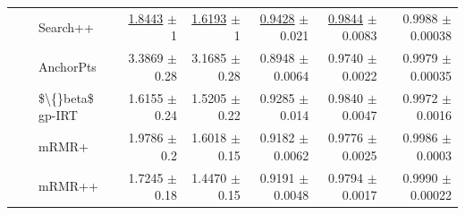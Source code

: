 \begin{longtable}{llp{}rrrrr}
 &  & Search++ & \underline{1.8443} {\scriptsize $\pm$ 1} & \underline{1.6193} {\scriptsize $\pm$ 1} & \underline{0.9428} {\scriptsize $\pm$ 0.021} & \underline{0.9844} {\scriptsize $\pm$ 0.0083} & 0.9988 {\scriptsize $\pm$ 0.00038} \\
 &  & AnchorPts & 3.3869 {\scriptsize $\pm$ 0.28} & 3.1685 {\scriptsize $\pm$ 0.28} & 0.8948 {\scriptsize $\pm$ 0.0064} & 0.9740 {\scriptsize $\pm$ 0.0022} & 0.9979 {\scriptsize $\pm$ 0.00035} \\
 &  & \$\textbackslash\{\}beta\$ gp-IRT & 1.6155 {\scriptsize $\pm$ 0.24} & 1.5205 {\scriptsize $\pm$ 0.22} & 0.9285 {\scriptsize $\pm$ 0.014} & 0.9840 {\scriptsize $\pm$ 0.0047} & 0.9972 {\scriptsize $\pm$ 0.0016} \\
 &  & mRMR+ & 1.9786 {\scriptsize $\pm$ 0.2} & 1.6018 {\scriptsize $\pm$ 0.15} & 0.9182 {\scriptsize $\pm$ 0.0062} & 0.9776 {\scriptsize $\pm$ 0.0025} & 0.9986 {\scriptsize $\pm$ 0.0003} \\
 &  & mRMR++ & 1.7245 {\scriptsize $\pm$ 0.18} & 1.4470 {\scriptsize $\pm$ 0.15} & 0.9191 {\scriptsize $\pm$ 0.0048} & 0.9794 {\scriptsize $\pm$ 0.0017} & 0.9990 {\scriptsize $\pm$ 0.00022} \\
\end{longtable}